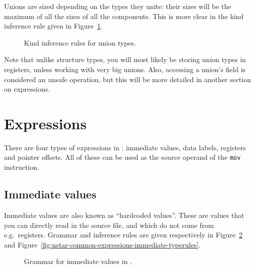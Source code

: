 Unions are sized depending on the types they unite: their sizes will be the maximum of all the sizes of all the components.
This is more clear in the kind inference rule given in Figure~\ref{fig:nstar-common-ts-unions-kindrules}.

\begin{figure}[H]
	\centering


	\caption{Kind inference rules for union types.}
	\label{fig:nstar-common-ts-unions-kindrules}
\end{figure}

Note that unlike structure types, you will most likely be storing union types in registers, unless working with very big unions.
Also, accessing a union's field is considered an unsafe operation, but this will be more detailed in another section on expressions.

\section{Expressions}\label{sec:nstar-common-expressions}

There are four types of expressions in \nstar: immediate values, data labels, registers and pointer offsets.
All of these can be used as the source operand of the \texttt{mov} instruction.

\subsection{Immediate values}\label{subsec:nstar-common-expressions-immediate}

Immediate values are also known as ``hardcoded values''.
These are values that you can directly read in the source file, and which do not come from e.g.\ registers.
Grammar and inference rules are given respectively in Figure~\ref{fig:nstar-common-expressions-immediate-grammar} and Figure~\ref{fig:nstar-common-expressions-immediate-typerules}.

\begin{figure}[H]
	\centering


	\caption{Grammar for immediate values in \nstar.}
	\label{fig:nstar-common-expressions-immediate-grammar}
\end{figure}

